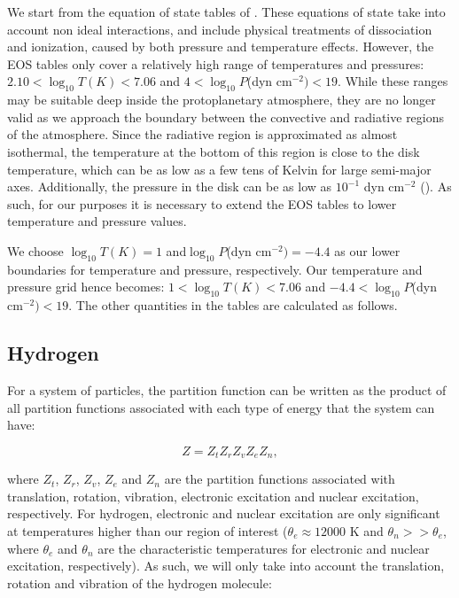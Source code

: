 \documentclass[apj]{emulateapj}
\begin{document}
We start from the equation of state tables of \cite{saumon95}. These equations of state take into account non ideal interactions, and include physical treatments of dissociation and ionization, caused by both pressure and temperature effects. However, the \cite{saumon95} EOS tables only cover a relatively high range of temperatures and pressures: $2.10 < \log_{10} T(K)<7.06$ and $4<\log_{10}P$(dyn cm$^{-2})<19$. While these ranges may be suitable deep inside the protoplanetary atmosphere, they are no longer valid as we approach the boundary between the convective and radiative regions of the atmosphere. Since the radiative region is approximated as almost isothermal, the temperature at the bottom of this region is close to the disk temperature, which can be as low as a few tens of Kelvin for large semi-major axes. Additionally, the pressure in the disk can be as low as $10^{-1}$ dyn cm$^{-2}$ (\cite{pn05}). As such, for our purposes it is necessary to extend the \cite{saumon95} EOS tables to lower temperature and pressure values.

We choose $\log_{10} T (K)=1$ and$ \log_{10}P$(dyn cm$^{-2})=-4.4$ as our lower boundaries for temperature and pressure, respectively. Our temperature and pressure grid hence becomes: $1 < \log_{10} T(K)<7.06$ and $-4.4<\log_{10}P$(dyn cm$^{-2})<19$. The other quantities in the tables are calculated as follows.

\subsection{Hydrogen}

\label{hydrogen}

For a system of particles, the partition function can be written as the product of all partition functions associated with each type of energy that the system can have:

\begin{equation}
\label{eq:z}
Z=Z_t Z_r Z_v Z_e Z_n,
\end{equation}

\noindent where $Z_t$, $Z_r$, $Z_v$, $Z_e$ and $Z_n$ are the partition functions associated with translation, rotation, vibration, electronic excitation and nuclear excitation, respectively. For hydrogen, electronic and nuclear excitation are only significant at temperatures higher than our region of interest ($\theta_e \approx 12000$ K and $\theta_n >> \theta_e$, where $\theta_e$ and $\theta_n$ are the characteristic temperatures for electronic and nuclear excitation, respectively). As such, we will only take into account the translation, rotation and vibration of the hydrogen molecule:
\end{document}
